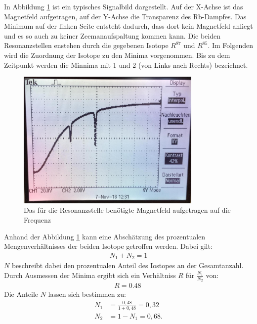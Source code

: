 In Abbildung \ref{fig:bild} ist ein typisches Signalbild dargestellt.
Auf der X-Achse ist das Magnetfeld aufgetragen, auf der Y-Achse die Transparenz des Rb-Dampfes.
Das Minimum auf der linken Seite entsteht dadurch, dass dort kein Magnetfeld anliegt und es so auch zu keiner Zeemanaufspaltung kommen kann.
Die beiden Resonanzstellen enstehen durch die gegebenen Isotope $R^{87}$ und $R^{85}$.
Im Folgenden wird die Zuordnung der Isotope zu den Minima vorgenommen.
Bis zu dem Zeitpunkt werden die Minnima mit 1 und 2 (von Links nach Rechts) bezeichnet.
\begin{figure}[h!]
  \centering
  \includegraphics[width=0.8\textwidth]{bild.jpeg}
  \caption{Das für die Resonanzstelle benötigte Magnetfeld aufgetragen auf die Frequenz}
  \label{fig:bild}
\end{figure}
Anhand der Abbildung \ref{fig:bild} kann eine Abschätzung des prozentualen Mengenverhältnisses der beiden Isotope getroffen werden.
Dabei gilt:
\begin{align*}
  N_1+N_2 = 1
\end{align*}
$N$ beschreibt dabei den prozentualen Anteil des Iostopes an der Gesamtanzahl.
Durch Ausmessen der Minima ergibt sich ein Verhältniss $R$ für $\frac{N_1}{N_2}$ von:
\begin{align*}
  R=\SI{0.48}{}
\end{align*}
Die Anteile $N$ lassen sich bestimmen zu:
\begin{align*}
  N_1&=\frac{0,48}{1+0,48}=0,32\\
  N_2&=1-N_1=0,68.
\end{align*}


